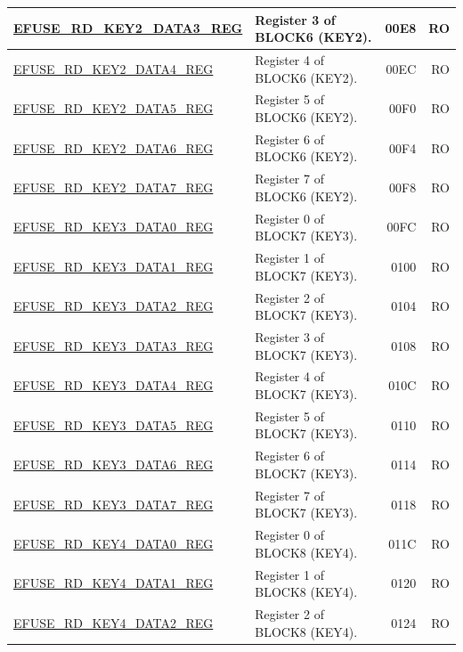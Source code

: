 \begin{longtable}{ | m{6cm} | m{7.2cm} | r| r | }
\hyperref[regdesc:EFUSERDKEY2DATANREG]{EFUSE\_RD\_KEY2\_DATA3\_REG} & Register 3 of BLOCK6 (KEY2). & \hexprefix{}00E8 & RO \\ \hline
\hyperref[regdesc:EFUSERDKEY2DATANREG]{EFUSE\_RD\_KEY2\_DATA4\_REG} & Register 4 of BLOCK6 (KEY2). & \hexprefix{}00EC & RO \\ \hline
\hyperref[regdesc:EFUSERDKEY2DATANREG]{EFUSE\_RD\_KEY2\_DATA5\_REG} & Register 5 of BLOCK6 (KEY2). & \hexprefix{}00F0 & RO \\ \hline
\hyperref[regdesc:EFUSERDKEY2DATANREG]{EFUSE\_RD\_KEY2\_DATA6\_REG} & Register 6 of BLOCK6 (KEY2). & \hexprefix{}00F4 & RO \\ \hline
\hyperref[regdesc:EFUSERDKEY2DATANREG]{EFUSE\_RD\_KEY2\_DATA7\_REG} & Register 7 of BLOCK6 (KEY2). & \hexprefix{}00F8 & RO \\ \hline
\hyperref[regdesc:EFUSERDKEY3DATANREG]{EFUSE\_RD\_KEY3\_DATA0\_REG} & Register 0 of BLOCK7 (KEY3). & \hexprefix{}00FC & RO \\ \hline
\hyperref[regdesc:EFUSERDKEY3DATANREG]{EFUSE\_RD\_KEY3\_DATA1\_REG} & Register 1 of BLOCK7 (KEY3). & \hexprefix{}0100 & RO \\ \hline
\hyperref[regdesc:EFUSERDKEY3DATANREG]{EFUSE\_RD\_KEY3\_DATA2\_REG} & Register 2 of BLOCK7 (KEY3). & \hexprefix{}0104 & RO \\ \hline
\hyperref[regdesc:EFUSERDKEY3DATANREG]{EFUSE\_RD\_KEY3\_DATA3\_REG} & Register 3 of BLOCK7 (KEY3). & \hexprefix{}0108 & RO \\ \hline
\hyperref[regdesc:EFUSERDKEY3DATANREG]{EFUSE\_RD\_KEY3\_DATA4\_REG} & Register 4 of BLOCK7 (KEY3). & \hexprefix{}010C & RO \\ \hline
\hyperref[regdesc:EFUSERDKEY3DATANREG]{EFUSE\_RD\_KEY3\_DATA5\_REG} & Register 5 of BLOCK7 (KEY3). & \hexprefix{}0110 & RO \\ \hline
\hyperref[regdesc:EFUSERDKEY3DATANREG]{EFUSE\_RD\_KEY3\_DATA6\_REG} & Register 6 of BLOCK7 (KEY3). & \hexprefix{}0114 & RO \\ \hline
\hyperref[regdesc:EFUSERDKEY3DATANREG]{EFUSE\_RD\_KEY3\_DATA7\_REG} & Register 7 of BLOCK7 (KEY3). & \hexprefix{}0118 & RO \\ \hline
\hyperref[regdesc:EFUSERDKEY4DATANREG]{EFUSE\_RD\_KEY4\_DATA0\_REG} & Register 0 of BLOCK8 (KEY4). & \hexprefix{}011C & RO \\ \hline
\hyperref[regdesc:EFUSERDKEY4DATANREG]{EFUSE\_RD\_KEY4\_DATA1\_REG} & Register 1 of BLOCK8 (KEY4). & \hexprefix{}0120 & RO \\ \hline
\hyperref[regdesc:EFUSERDKEY4DATANREG]{EFUSE\_RD\_KEY4\_DATA2\_REG} & Register 2 of BLOCK8 (KEY4). & \hexprefix{}0124 & RO \\ \hline

\end{longtable}
